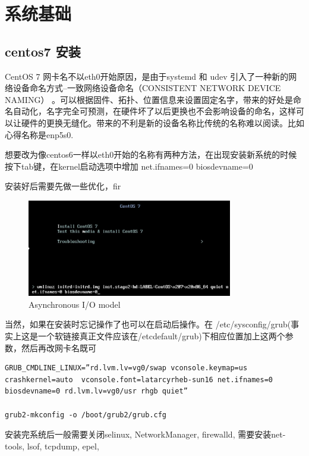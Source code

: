 \chapter{系统基础}

\section{centos7 安装}

CentOS 7 网卡名不以eth0开始原因，是由于systemd 和 udev 引入了一种新的网络设备命名方式–一致网络设备命名（CONSISTENT NETWORK DEVICE NAMING） 。可以根据固件、拓扑、位置信息来设置固定名字，带来的好处是命名自动化，名字完全可预测，在硬件坏了以后更换也不会影响设备的命名，这样可以让硬件的更换无缝化。带来的不利是新的设备名称比传统的名称难以阅读。比如心得名称是enp5s0.

想要改为像centos6一样以eth0开始的名称有两种方法，在出现安装新系统的时候按下tab键，在kernel启动选项中增加 net.ifnames=0 biosdevname=0 

安装好后需要先做一些优化，fir

\begin{figure}[!ht]
    \centering    
    \includegraphics[width=0.8\textwidth]{basic/images/centos-bios.png}
    \caption{\label{Fig:async} Asynchronous I/O model}
\end{figure}

当然，如果在安装时忘记操作了也可以在启动后操作。在 /etc/sysconfig/grub(事实上这是一个软链接真正文件应该在/etcdefault/grub)下相应位置加上这两个参数，然后再改网卡名既可


\begin{lstlisting}
GRUB_CMDLINE_LINUX=”rd.lvm.lv=vg0/swap vconsole.keymap=us crashkernel=auto  vconsole.font=latarcyrheb-sun16 net.ifnames=0 biosdevname=0 rd.lvm.lv=vg0/usr rhgb quiet”

grub2-mkconfig -o /boot/grub2/grub.cfg

\end{lstlisting}

安装完系统后一般需要关闭selinux, NetworkManager, firewalld, 需要安装net-tools, lsof, tcpdump, epel,

